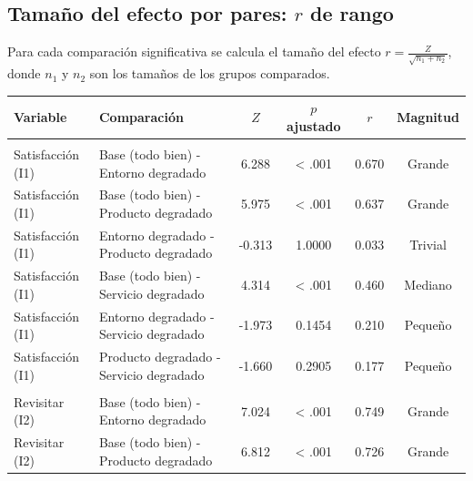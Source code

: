 \documentclass[
  spanish,
]{article}
\begin{document}
\subsection{\texorpdfstring{Tamaño del efecto por pares: \(r\) de
rango}{Tamaño del efecto por pares: r de rango}}\label{tamauxf1o-del-efecto-por-pares-r-de-rango}

Para cada comparación significativa se calcula el tamaño del efecto
\(r = \frac{Z}{\sqrt{n_1 + n_2}}\), donde \(n_1\) y \(n_2\) son los
tamaños de los grupos comparados.

\begin{table}[!h]
\centering\begingroup\fontsize{9}{11}\selectfont

\begin{tabular}{llcccc}
\toprule
Variable & Comparación & $Z$ & $p$ ajustado & $r$ & Magnitud\\
\midrule
\addlinespace[0.3em]
\multicolumn{6}{l}{\textbf{Revisitar (I2)}}\\
\hspace{1em}Satisfacción (I1) & Base (todo bien) - Entorno degradado & 6.288 & < .001 & 0.670 & Grande\\
\hspace{1em}Satisfacción (I1) & Base (todo bien) - Producto degradado & 5.975 & < .001 & 0.637 & Grande\\
\hspace{1em}Satisfacción (I1) & Entorno degradado - Producto degradado & -0.313 & 1.0000 & 0.033 & Trivial\\
\hspace{1em}Satisfacción (I1) & Base (todo bien) - Servicio degradado & 4.314 & < .001 & 0.460 & Mediano\\
\hspace{1em}Satisfacción (I1) & Entorno degradado - Servicio degradado & -1.973 & 0.1454 & 0.210 & Pequeño\\
\hspace{1em}Satisfacción (I1) & Producto degradado - Servicio degradado & -1.660 & 0.2905 & 0.177 & Pequeño\\
\addlinespace[0.3em]
\multicolumn{6}{l}{\textbf{Satisfacción (I1)}}\\
\hspace{1em}Revisitar (I2) & Base (todo bien) - Entorno degradado & 7.024 & < .001 & 0.749 & Grande\\
\hspace{1em}Revisitar (I2) & Base (todo bien) - Producto degradado & 6.812 & < .001 & 0.726 & Grande\\

\end{tabular}
\end{table}
\end{document}
